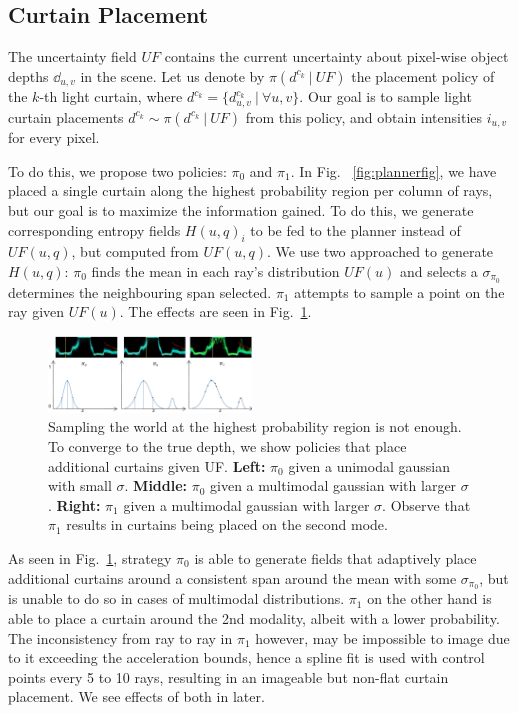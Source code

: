 \subsection{Curtain Placement}

The uncertainty field $UF$ contains the current uncertainty about pixel-wise object depths $\dd_{u, v}$ in the scene. Let us denote by $\pi(d^{c_k}\ |\ UF)$ the placement policy of the $k$-th light curtain, where $d^{c_k} = \{d^{c_k}_{u, v}\ |\ \forall u, v\}$. Our goal is to sample light curtain placements $d^{c_k} \sim \pi(d^{c_k}\ |\ UF)$ from this policy, and obtain intensities $i_{u, v}$ for every pixel.

To do this, we propose two policies: $\pi_{0}$ and $\pi_{1}$. In Fig. ~\ref{fig:plannerfig}, we have placed a single curtain along the highest probability region per column of rays, but our goal is to maximize the information gained. To do this, we generate corresponding entropy fields $H(u, q)_{i}$ to be fed to the planner instead of $UF(u, q)$, but computed from $UF(u, q)$. We use two approached to generate $H(u, q)$: $\pi_{0}$ finds the mean in each ray's distribution $UF(u)$ and selects a $\sigma_{\pi_{0}}$ determines the neighbouring span selected. $\pi_{1}$ attempts to sample a point on the ray given $UF(u)$. The effects are seen in Fig.~\ref{fig:m0m1}.

\begin{figure}[h]
   \centering
       \centering
       \includegraphics[width=0.48\textwidth]{figures/fields.pdf}
   \centering
   \caption{Sampling the world at the highest probability region is not enough. To converge to the true depth, we show policies that place additional curtains given UF. \textbf{Left:} $\pi_{0}$ given a unimodal gaussian with small $\sigma$. \textbf{Middle:} $\pi_{0}$ given a multimodal gaussian with larger $\sigma$. \textbf{Right:} $\pi_{1}$ given a multimodal gaussian with larger $\sigma$. Observe that $\pi_{1}$ results in curtains being placed on the second mode.} 
   \label{fig:m0m1} 
\end{figure}

As seen in Fig.~\ref{fig:m0m1}, strategy $\pi_{0}$ is able to generate fields that adaptively place additional curtains around a consistent span around the mean with some $\sigma_{\pi_{0}}$, but is unable to do so in cases of multimodal distributions. $\pi_{1}$ on the other hand is able to place a curtain around the 2nd modality, albeit with a lower probability. The inconsistency from ray to ray in $\pi_{1}$ however, may be impossible to image due to it exceeding the acceleration bounds, hence a spline fit is used with control points every 5 to 10 rays, resulting in an imageable but non-flat curtain placement. We see effects of both in later.

